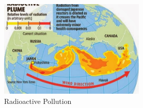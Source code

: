 \begin{figure}[h]
\centering
  \includegraphics[width=70mm]{radiation.jpg}
  \caption{Radioactive Pollution}
  \label{fig:Radioactive Pollution}
\end{figure}








